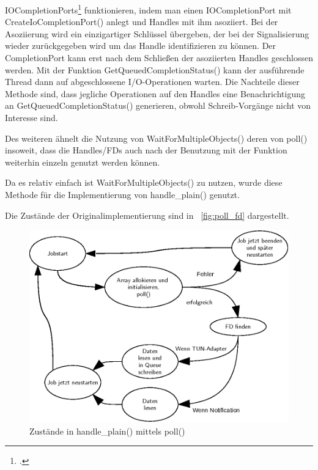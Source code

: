 {IOCompletionPorts\footcite[][]{_createiocompletionport_2016} funktionieren, indem man einen IOCompletionPort mit CreateIoCompletionPort()
anlegt und Handles mit ihm asoziiert. Bei der Asoziierung wird ein einzigartiger Schlüssel
übergeben, der bei der Signalisierung wieder zurückgegeben wird um das Handle identifizieren zu können.
Der CompletionPort kann erst nach dem Schließen der asoziierten Handles geschlossen werden.
Mit der Funktion GetQueuedCompletionStatus() kann der ausführende Thread dann auf abgeschlossene
I/O-Operationen warten.
Die Nachteile dieser Methode sind, dass jegliche Operationen auf den Handles eine Benachrichtigung
an GetQueuedCompletionStatus() generieren, obwohl Schreib-Vorgänge nicht von Interesse sind.

Des weiteren ähnelt die Nutzung von WaitForMultipleObjects() deren von poll()
insoweit, dass die Handles/\acp{FD} auch nach der Benutzung mit der Funktion
weiterhin einzeln genutzt werden können.

Da es relativ einfach ist WaitForMultipleObjects() zu nutzen, wurde diese Methode
für die Implementierung von handle\_plain() genutzt.

Die Zustände der Originalimplementierung sind in ~\autoref{fig:poll_fd}
dargestellt.

\begin{figure}
\centering
\def\svgwidth{\columnwidth}
\includegraphics[width=\textwidth]{poll_fd.eps}
\caption{Zustände in handle\_plain() mittels poll()}
\label{fig:poll_fd}
\end{figure}


}

